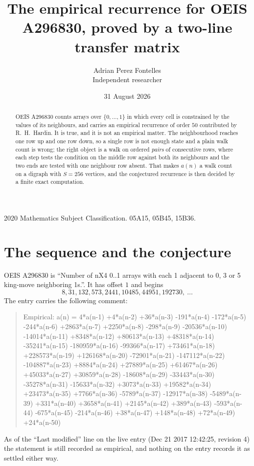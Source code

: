 \documentclass[11pt,a4paper]{article}
\title{The empirical recurrence for OEIS A296830, proved by a two-line transfer matrix}
\author{Adrian Perez Fontelles\\ \small Independent researcher}
\date{31 August 2026}
\theoremstyle{plain}
\theoremstyle{definition}
\begin{document}
\maketitle

\begin{abstract}
OEIS A296830 counts arrays over $\{0,\dots,1\}$ in which every cell is constrained by the
values of its neighbours, and carries an empirical recurrence of order $50$ contributed
by R.~H.~Hardin. It is true, and it is not an empirical matter. The neighbourhood reaches one
row up and one row down, so a single row is not enough state and a plain walk count
is wrong; the right object is a walk on ordered \emph{pairs} of consecutive rows, where
each step tests the condition on the middle row against both its neighbours and the two
ends are tested with one neighbour row absent. That makes $a(n)$ a walk count on a digraph
with $S=256$ vertices, and the conjectured recurrence is then decided by a finite exact
computation.
\end{abstract}

\noindent\small 2020 Mathematics Subject Classification. 05A15, 05B45, 15B36.\normalsize

\section{The sequence and the conjecture}

OEIS A296830 is ``Number of nX4 0..1 arrays with each 1 adjacent to 0, 3 or 5 king-move neighboring 1s.''. It has offset $1$ and begins
\[
8, 31, 132, 573, 2441, 10485, 44951, 192730,\ \dots
\]
The entry carries the following comment:
\begin{quote}\small
Empirical: a(n) = 4*a(n-1) +4*a(n-2) +36*a(n-3) -191*a(n-4) -172*a(n-5) -244*a(n-6) +2863*a(n-7) +2250*a(n-8) -298*a(n-9) -20536*a(n-10) -14014*a(n-11) +8348*a(n-12) +80613*a(n-13) +48318*a(n-14) -35241*a(n-15) -180959*a(n-16) -99366*a(n-17) +73461*a(n-18) +228573*a(n-19) +126168*a(n-20) -72901*a(n-21) -147112*a(n-22) -104887*a(n-23) +8884*a(n-24) +27889*a(n-25) +61467*a(n-26) +45033*a(n-27) +30859*a(n-28) -18608*a(n-29) -33443*a(n-30) -35278*a(n-31) -15633*a(n-32) +3073*a(n-33) +19582*a(n-34) +23473*a(n-35) +7766*a(n-36) -5789*a(n-37) -12917*a(n-38) -5489*a(n-39) +331*a(n-40) +3658*a(n-41) +2145*a(n-42) +389*a(n-43) -593*a(n-44) -675*a(n-45) -214*a(n-46) +38*a(n-47) +148*a(n-48) +72*a(n-49) +24*a(n-50)
\end{quote}
As of the ``Last modified'' line on the live entry (Dec 21 2017 12:42:25, revision 4) the statement is
still recorded as empirical, and nothing on the entry records it as settled either way.
\end{document}
